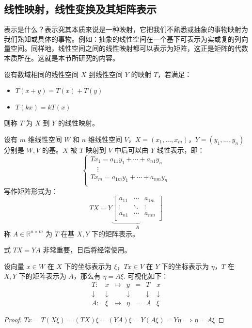 \subsection{线性映射，线性变换及其矩阵表示}

表示是什么？表示究其本质来说是一种映射，它把我们不熟悉或抽象的事物映射为我们熟知或具体的事物。例如：抽象的线性空间在一个基下可表示为实或复的列向量空间。同样地，线性空间之间的线性映射都可以表示为矩阵，这正是矩阵的代数本质所在。这就是本节所研究的内容。


\begin{definition}[线性映射]
设有数域相同的线性空间 $X$ 到线性空间 $Y$ 的映射 $T$，若满足：
\begin{itemize}
    \item $T(x+y)=T(x)+T(y)$
    \item $T(kx)=kT(x)$
\end{itemize}
则称 $T$ 为 $X$ 到 $Y$ 的线性映射。
\end{definition}

\begin{definition}[线性映射的矩阵表示]
\label{def:matrixrepr}
设有 $m$ 维线性空间 $W$ 和 $n$ 维线性空间 $V$，$X=(x_1,\ldots,x_m)$，$Y=(y_1,\ldots,y_n)$ 分别是 $W,V$ 的基。$X$ 被 $T$ 映射到 $V$ 中后可以由 $Y$ 线性表示，即：
\[
\begin{cases}
Tx_1=a_{11}y_1+\cdots+a_{n1}y_n\\
\quad\vdots\\
Tx_m=a_{1m}y_1+\cdots+a_{nm}y_n\\
\end{cases}
\]
写作矩阵形式为：
\[
TX=Y
\underbrace{\begin{bmatrix}
a_{11}&\cdots&a_{1m}\\
\vdots&\ddots&\vdots\\
a_{n1}&\cdots&a_{nm}\\
\end{bmatrix}}_A
\]
称 $A\in\mathbb R^{n\times m}$ 为 $T$ 在基 $X,Y$ 下的矩阵表示。
\end{definition}

\begin{remark}
式 $TX=YA$ 非常重要，日后将经常使用。
\end{remark}

\begin{theorem}[向量在不同基下的表示坐标的关系]
设向量 $x\in W$ 在 $X$ 下的坐标表示为 $\xi$，$Tx\in V$ 在 $Y$ 下的坐标表示为 $\eta$，$T$ 在 $X,Y$ 下的矩阵表示为 $A$，那么有 $\eta=A\xi$. 可视化如下：
\[
\begin{array}{ccccccc}
    T: & x   & \mapsto & y    & = & T & x   \\
    \downarrow & \downarrow & & \downarrow & & \downarrow & \downarrow \\
    A: & \xi & \mapsto & \eta & = & A & \xi
\end{array}
\]
\end{theorem}
\begin{proof}
$Tx=T(X\xi)=(TX)\xi=(YA)\xi=Y(A\xi)=Y\eta\implies \eta=A\xi$
\end{proof}

